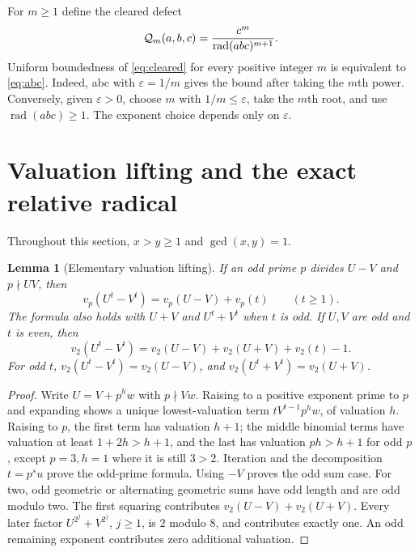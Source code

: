\documentclass[11pt]{article}
\newtheorem{lemma}[theorem]{Lemma}
\theoremstyle{definition}\newtheorem{definition}[theorem]{Definition}
\theoremstyle{remark}\newtheorem{remark}[theorem]{Remark}
\DeclareMathOperator{\rad}{rad}\DeclareMathOperator{\ord}{ord}\DeclareMathOperator{\lcm}{lcm}
\begin{document}
For $m\ge1$ define the cleared defect
\begin{equation}\label{eq:cleared}
\Qm(a,b,c)=\frac{c^m}{\rad(abc)^{m+1}}.
\end{equation}
Uniform boundedness of \eqref{eq:cleared} for every positive integer $m$ is
equivalent to \eqref{eq:abc}. Indeed, abc with $\varepsilon=1/m$ gives the
bound after taking the $m$th power. Conversely, given $\varepsilon>0$, choose
$m$ with $1/m\le\varepsilon$, take the $m$th root, and use
$\rad(abc)\ge1$. The exponent choice depends only on $\varepsilon$.

\section{Valuation lifting and the exact relative radical}
Throughout this section, $x>y\ge1$ and $\gcd(x,y)=1$.

\begin{lemma}[Elementary valuation lifting]\label{lem:lte}
If an odd prime $p$ divides $U-V$ and $p\nmid UV$, then
\[
v_p(U^t-V^t)=v_p(U-V)+v_p(t)\qquad(t\ge1).
\]
The formula also holds with $U+V$ and $U^t+V^t$ when $t$ is odd.
If $U,V$ are odd and $t$ is even, then
\[
v_2(U^t-V^t)=v_2(U-V)+v_2(U+V)+v_2(t)-1.
\]
For odd $t$, $v_2(U^t-V^t)=v_2(U-V)$, and
$v_2(U^t+V^t)=v_2(U+V)$.
\end{lemma}
\begin{proof}
Write $U=V+p^h w$ with $p\nmid Vw$. Raising to a positive exponent prime to
$p$ and expanding shows a unique lowest-valuation term $tV^{t-1}p^h w$,
of valuation $h$. Raising to $p$, the first term has valuation $h+1$;
the middle binomial terms have valuation at least $1+2h>h+1$, and the last
has valuation $ph>h+1$ for odd $p$, except $p=3,h=1$ where it is still
$3>2$. Iteration and the decomposition $t=p^s u$ prove the odd-prime formula.
Using $-V$ proves the odd sum case. For two, odd geometric or alternating
geometric sums have odd length and are odd modulo two. The first squaring
contributes $v_2(U-V)+v_2(U+V)$. Every later factor
$U^{2^j}+V^{2^j}$, $j\ge1$, is $2$ modulo $8$, and contributes exactly one.
An odd remaining exponent contributes zero additional valuation.
\end{proof}
\end{document}
